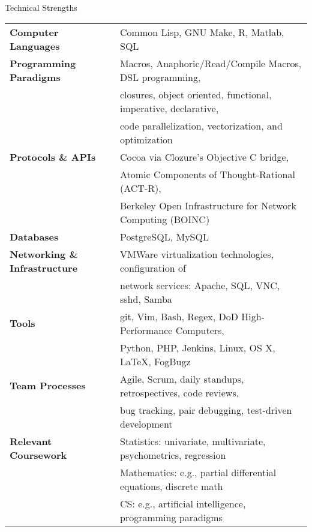 

\begin{rSection}{Technical Strengths}

\begin{tabular}{ @{} >{\bfseries}l @{\hspace{5ex}} l }
Computer Languages & 		Common Lisp, GNU Make, R, Matlab, SQL \\
Programming Paradigms &		Macros, Anaphoric/Read/Compile Macros, DSL programming, \\
& 				closures, object oriented, functional, imperative, declarative, \\
&				code parallelization, vectorization, and optimization \\
Protocols \& APIs & 		Cocoa via Clozure's Objective C bridge, \\
&				Atomic Components of Thought-Rational (ACT-R), \\
&				Berkeley Open Infrastructure for Network Computing (BOINC) \\
Databases &			PostgreSQL, MySQL \\
Networking \& Infrastructure &	VMWare virtualization technologies, configuration of \\
&				network services: Apache, SQL, VNC, sshd, Samba \\
Tools & 			git, Vim, Bash, Regex, DoD High-Performance Computers, \\
&				Python, PHP, Jenkins, Linux, OS X, \LaTeX, FogBugz \\
Team Processes & 		Agile, Scrum, daily standups, retrospectives, code reviews, \\
& 				bug tracking, pair debugging, test-driven development \\
Relevant Coursework &		Statistics: univariate, multivariate, psychometrics, regression \\
&				Mathematics: e.g., partial differential equations, discrete math \\
&				CS: e.g., artificial intelligence, programming paradigms
\end{tabular}

\end{rSection}

